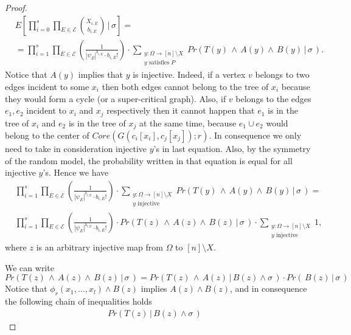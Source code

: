 \documentclass[11pt,notitlepage]{report}
\theoremstyle{definition}
\theoremstyle{remark}
\begin{document}
\begin{proof}
	\begin{align} \nonumber
		& E\left[\prod_{i=0}^{s}\prod_{E\in \mathcal{E}}
		\binom{X_{i,E}}{b_{i,E}} \, \bigg|\, \sigma \right]= \\
		&=\prod_{i=1}^{s}
		\prod_{E\in \mathcal{E}} \left(\frac{1}{|\psi_E|^{b_{i,E}} \cdot b_{i,E}!}\right) \cdot
		\sum_{\substack{y:\Omega \rightarrow [n]\setminus X\\ 
		y \text{ satisfies } P}} 
		Pr( T(y) \, \wedge \, A(y) \wedge \, B(y) \, | \, \sigma \, ).		
	\end{align} 
	Notice that $A(y)$ implies that $y$ is injective. Indeed, if a vertex
	$v$ belongs to two edges incident to some $x_i$ then both edges cannot
	belong to the tree of $x_i$ because they would form a cycle (or a super-critical graph). Also, if $v$ belongs to the edges $e_1, e_2$
	incident to $x_i$ and $x_j$ respectively then it cannot happen that
	$e_1$ is in the tree of $x_i$ and $e_2$ is in the tree of $x_j$ at the
	same time, because $e_1\cup e_2$ would belong to the center of 
	$Core(G(c_i[x_i],c_j[x_j]);r)$.
	In consequence we only need to take in consideration injective $y$'s in 
	last equation. Also, by the symmetry of the random model, the probability
	written in that equation is equal for all injective $y$'s. 
	Hence we have
	\begin{align} \nonumber
		& \prod_{i=1}^{s}
		\prod_{E\in \mathcal{E}} \left(\frac{1}{|\psi_E|^{b_{i,E}} \cdot b_{i,E}!}\right) \cdot
		\sum_{\substack{y:\Omega \rightarrow [n]\setminus X\\ y \text{ injective}}} 
		Pr( T(y) \, \wedge \, A(y) \wedge \, B(y) \, | \, \sigma \, )=\\
		& \label{eqn:distributed}
		\prod_{i=1}^{s}
		\prod_{E\in \mathcal{E}} \left(\frac{1}{|\psi_E|^{b_{i,E}} \cdot b_{i,E}!}\right) \cdot
		Pr( T(z) \, \wedge \, A(z) \wedge \, B(z) \, | \, \sigma \, )
		\cdot \sum_{\substack{y:\Omega \rightarrow [n]\setminus X\\ y \text{ injective}}} 1,
	\end{align} 
   	where $z$ is an arbitrary injective map from $\Omega$ to
   	$[n]\setminus X$. \par
	We can write
	\[Pr( T(z) \, \wedge \, A(z) \wedge \, B(z) \, | \, \sigma \, )=
	Pr( T(z) \, \wedge \, A(z) \, | \, B(z) \wedge \sigma \, )
	\cdot Pr( \, B(z) \, | \, \sigma \, )\]
	Notice that $\phi_r(x_1,\dots, x_l)\wedge B(z)$ implies $A(z)\wedge
	B(z)$,	and in consequence the following chain of inequalities holds
	\begin{align*} 
	Pr( T(z)  \, | \, B(z) \wedge \sigma \, ) &

\end{align*}
\end{proof}
\end{document}
